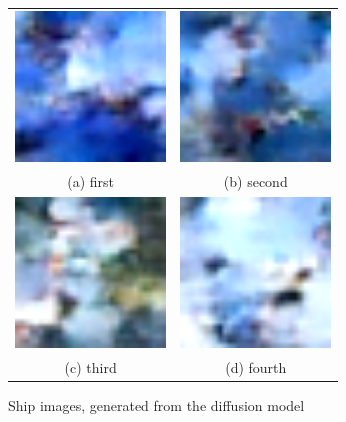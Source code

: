 \documentclass[conference]{IEEEtran}
\begin{document}
  \begin{figure}
    \begin{tabular}{cc}
      \includegraphics[width=40mm]{./images/generated-imgs-cosine/ship/0816.png} 
  &   \includegraphics[width=40mm]{./images/generated-imgs-cosine/ship/0817.png} 
  \\
    (a) first 
    & (b) second \\[6pt]
       \includegraphics[width=40mm]{./images/generated-imgs-cosine/ship/0818.png} 
    &  \includegraphics[width=40mm]{./images/generated-imgs-cosine/ship/0819.png} 
  \\
    (c) third & (d) fourth \\[6pt]
    \end{tabular}
    \caption{Ship images, generated from the diffusion model}
    \end{figure}
\end{document}
